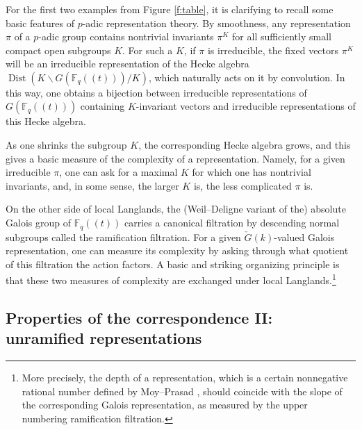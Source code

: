 \documentclass[10pt]{amsart}
\newcommand{\Fqt}{\Fq(\!(t)\!)}
\newcommand{\on}{\operatorname}
\newcommand{\Fq}{\mathbb{F}_q}
\theoremstyle{remark}
\numberwithin{equation}{section}
\newcommand{\cG}{\check{G}}
\begin{document}
\subsubsection{}For the first two examples from Figure \ref{f:table}, it is 
clarifying to recall some 
basic features of $p$-adic representation theory. By smoothness, any 
representation $\pi$ of a $p$-adic group contains nontrivial invariants $\pi^K$ 
for all sufficiently small compact open subgroups $K$. For such a $K$,	if $\pi$ is 
irreducible,  the fixed vectors $\pi^K$ will be an irreducible 
representation of the Hecke algebra $\on{Dist}(K \backslash G(\Fqt) / K)$, 
which naturally acts on it by convolution. In this way, one obtains a bijection 
between irreducible representations of 
$G(\Fqt)$ containing $K$-invariant vectors and irreducible representations of 
this Hecke algebra. 

As one shrinks the subgroup $K$, the corresponding Hecke algebra grows, and 
this gives a 
basic measure of the complexity of a representation. Namely, for a given 
irreducible $\pi$, one can ask for a maximal $K$ for which one has nontrivial 
invariants, and, in some sense, the larger $K$ is, the less complicated $\pi$ is. 


On the other side of local Langlands, the (Weil--Deligne variant of the) absolute 
Galois group of $\Fqt$ carries a canonical filtration by descending normal 
subgroups called the ramification filtration. For a given $\cG(k)$-valued Galois 
representation, one can measure its complexity by asking through what quotient 
of this filtration the action factors. A basic and striking organizing principle is that 
these two measures of complexity are exchanged under local Langlands.\footnote{More precisely, the depth of a representation, which is a certain nonnegative rational number defined by Moy--Prasad \cite{moyprasad}, should coincide with the slope of the corresponding Galois representation, as measured by the upper numbering ramification filtration.} 


\subsection{Properties of the correspondence II: unramified representations} 
	
\end{document}
